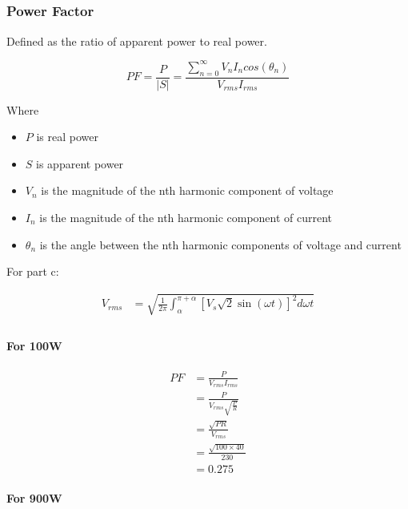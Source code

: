 \subsection{}

\subsubsection*{Power Factor}

Defined as the ratio of apparent power to real power.

$$
PF = \frac{P}{\left| S \right|} = \frac{\sum_{n=0}^\infty V_n I_n cos(\theta_n)}{V_{rms} I_{rms}}
$$

Where
\begin{itemize}
    \item $P$ is real power
    \item $S$ is apparent power
    \item $V_n$ is the magnitude of the nth harmonic component of voltage
    \item $I_n$ is the magnitude of the nth harmonic component of current
    \item $\theta_n$ is the angle between the nth harmonic components of voltage and current
\end{itemize}

For part c:

\begin{align*}
V_{rms} & = \sqrt{\frac{1}{2\pi} \int_\alpha^{\pi+\alpha} \left[ V_s \sqrt{2} \sin(\omega{}t)\right]^2 d \omega t} \\
\end{align*}


\paragraph*{For 100W}

\begin{align*}
PF & = \frac{P}{V_{rms} I_{rms}} \\
   & = \frac{P}{V_{rms} \sqrt{\frac{P}{R}}} \\
   & = \frac{\sqrt{PR}}{V_{rms}} \\
   & = \frac{\sqrt{100 \times 40}}{230} \\
   & = 0.275
\end{align*}

\paragraph*{For 900W}

